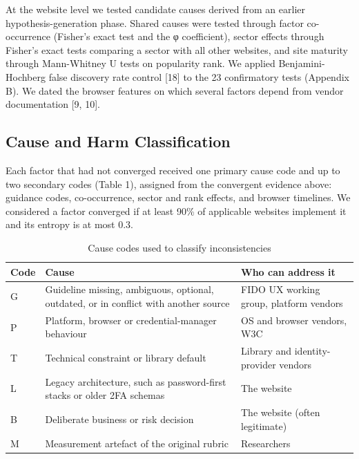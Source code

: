 \documentclass[letterpaper,twocolumn,10pt]{article}
\begin{document}
At the website level we tested candidate causes derived from an earlier hypothesis-generation phase. Shared causes were tested through factor co-occurrence (Fisher's exact test and the φ coefficient), sector effects through Fisher's exact tests comparing a sector with all other websites, and site maturity through Mann-Whitney U tests on popularity rank. We applied Benjamini-Hochberg false discovery rate control {[}18{]} to the 23 confirmatory tests (Appendix B). We dated the browser features on which several factors depend from vendor documentation {[}9, 10{]}.

\subsection{Cause and Harm Classification}

Each factor that had not converged received one primary cause code and up to two secondary codes (Table 1), assigned from the convergent evidence above: guidance codes, co-occurrence, sector and rank effects, and browser timelines. We considered a factor converged if at least 90\% of applicable websites implement it and its entropy is at most 0.3.

\begin{table}[t]\centering\footnotesize\setlength{\tabcolsep}{3pt}\caption{Cause codes used to classify inconsistencies}\label{tab:1}
\begin{tabularx}{\columnwidth}{l>{\raggedright\arraybackslash}X>{\raggedright\arraybackslash}X}\toprule
\textbf{Code} & \textbf{Cause} & \textbf{Who can address it} \\ \midrule
G & Guideline missing, ambiguous, optional, outdated, or in conflict with another source & FIDO UX working group, platform vendors \\
P & Platform, browser or credential-manager behaviour & OS and browser vendors, W3C \\
T & Technical constraint or library default & Library and identity-provider vendors \\
L & Legacy architecture, such as password-first stacks or older 2FA schemas & The website \\
B & Deliberate business or risk decision & The website (often legitimate) \\
M & Measurement artefact of the original rubric & Researchers \\
\bottomrule\end{tabularx}\end{table}
\end{document}
